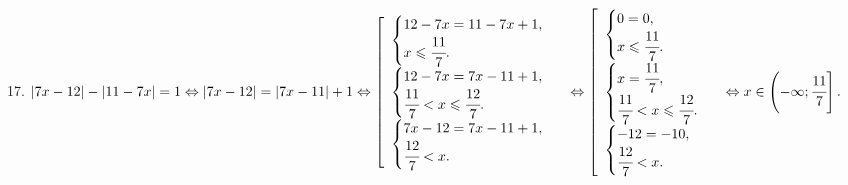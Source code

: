 17. $|7x-12|-|11-7x|=1\Leftrightarrow|7x-12|=|7x-11|+1\Leftrightarrow \left[\begin{array}{l}\begin{cases} 12-7x=11-7x+1,\\ x\leqslant\cfrac{11}{7}.\end{cases}\\
\begin{cases} 12-7x=7x-11+1,\\ \cfrac{11}{7}<x\leqslant\cfrac{12}{7}.\end{cases}\\ \begin{cases} 7x-12=7x-11+1,\\ \cfrac{12}{7}<x.\end{cases}\end{array}\right.\Leftrightarrow \left[\begin{array}{l}\begin{cases} 0=0,\\ x\leqslant\cfrac{11}{7}.\end{cases}\\
\begin{cases} x=\cfrac{11}{7},\\ \cfrac{11}{7}<x\leqslant\cfrac{12}{7}.\end{cases}\\ \begin{cases} -12=-10,\\ \cfrac{12}{7}<x.\end{cases}\end{array}\right.
\Leftrightarrow x\in \left(-\infty;\cfrac{11}{7}\right].$\\
